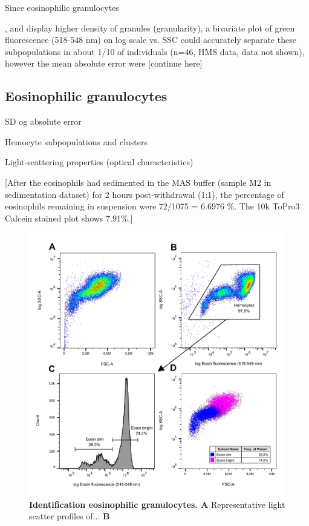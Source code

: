 Since eosinophilic granulocytes 

, and display higher density of granules (granularity), a bivariate plot of green fluorescence (518-548 nm) on log scale vs. SSC could accurately separate these subpopulations in about 1/10 of individuals (n=46, HMS data, data not shown), however the mean absolute error were [continue here]



\subsection{Eosinophilic granulocytes}


SD og absolute error

Hemocyte subpopulations and clusters

Light-scattering properties (optical characteristics)

[After the eosinophils had sedimented in the MAS buffer (sample M2 in sedimentation dataset) for 2 hours post-withdrawal (1:1), the percentage of eosinophils remaining in suspension were 72/1075 = 6.6976 \%. The 10k ToPro3 Calcein stained plot shows 7.91\%.]

\begin{figure}[!ht]
    \centering
    \includegraphics[width=1.0\textwidth]{figures/Eosin and Percoll exp/Pool II 0.75 per m.pdf}
    \caption{\textbf{Identification eosinophilic granulocytes. A} Representative light scatter profiles of... \textbf{B} }
    \label{fig:eosin_exp2}
\end{figure}


